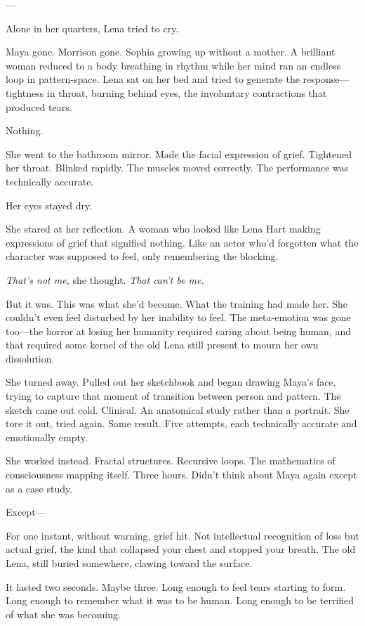 ---

Alone in her quarters, Lena tried to cry.

Maya gone. Morrison gone. Sophia growing up without a mother. A brilliant woman reduced to a body breathing in rhythm while her mind ran an endless loop in pattern-space. Lena sat on her bed and tried to generate the response---tightness in throat, burning behind eyes, the involuntary contractions that produced tears.

Nothing.

She went to the bathroom mirror. Made the facial expression of grief. Tightened her throat. Blinked rapidly. The muscles moved correctly. The performance was technically accurate.

Her eyes stayed dry.

She stared at her reflection. A woman who looked like Lena Hart making expressions of grief that signified nothing. Like an actor who'd forgotten what the character was supposed to feel, only remembering the blocking.

\textit{That's not me,} she thought. \textit{That can't be me.}

But it was. This was what she'd become. What the training had made her. She couldn't even feel disturbed by her inability to feel. The meta-emotion was gone too---the horror at losing her humanity required caring about being human, and that required some kernel of the old Lena still present to mourn her own dissolution.

She turned away. Pulled out her sketchbook and began drawing Maya's face, trying to capture that moment of transition between person and pattern. The sketch came out cold. Clinical. An anatomical study rather than a portrait. She tore it out, tried again. Same result. Five attempts, each technically accurate and emotionally empty.

She worked instead. Fractal structures. Recursive loops. The mathematics of consciousness mapping itself. Three hours. Didn't think about Maya again except as a case study.

Except---

For one instant, without warning, grief hit. Not intellectual recognition of loss but actual grief, the kind that collapsed your chest and stopped your breath. The old Lena, still buried somewhere, clawing toward the surface.

It lasted two seconds. Maybe three. Long enough to feel tears starting to form. Long enough to remember what it was to be human. Long enough to be terrified of what she was becoming.

